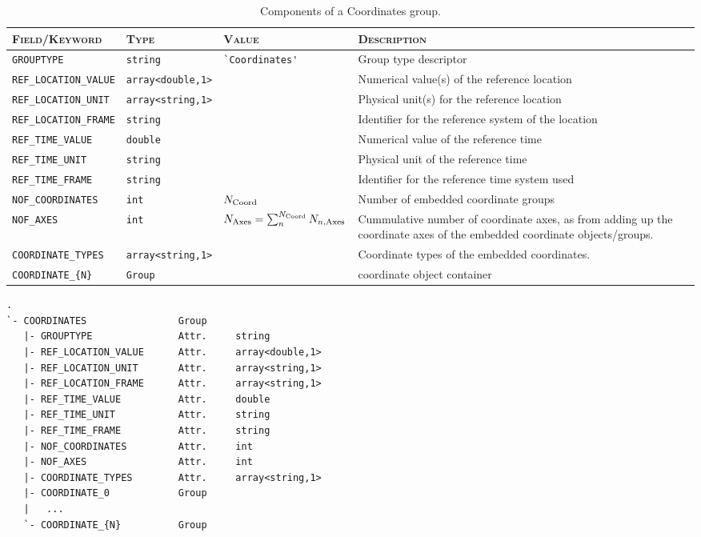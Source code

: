 \documentclass[a4paper,10pt,bibtotoc]{scrreprt}
\begin{document}
\begin{table}[ht]
 \centering
  \begin{tabular}{|lllp{5cm}|} 
    \hline
    \textsc{Field/Keyword} & \textsc{Type} & \textsc{Value} & \textsc{Description} \\
    \hline \hline
    \small{\verb|GROUPTYPE|} & \verb|string| & \verb|`Coordinates'| &
    Group type descriptor \\
    \small{\verb|REF_LOCATION_VALUE|}  & \verb|array<double,1>| &  &
    Numerical value(s) of the reference location \\
    \small{\verb|REF_LOCATION_UNIT|} & \verb|array<string,1>| &  &
    Physical unit(s) for the reference location \\
    \small{\verb|REF_LOCATION_FRAME|} & \texttt{string} &  &
    Identifier for the reference system of the location \\
    \small{\verb|REF_TIME_VALUE|} & \texttt{double} &  & Numerical value of the
    reference time \\
    \small{\verb|REF_TIME_UNIT|} & \texttt{string} &  & Physical unit of the
    reference time \\
    \small{\verb|REF_TIME_FRAME|} & \texttt{string} &  & Identifier for the reference
    time system used \\
    \small{\verb|NOF_COORDINATES|} & \texttt{int} & $N_{\rm Coord}$ & Number of
    embedded coordinate groups \\
    \small{\verb|NOF_AXES|} & \texttt{int} & $N_{\rm Axes} =
    \sum_{n}^{N_{\rm Coord}} N_{n,\rm Axes}$ & Cummulative number of
    coordinate axes, as from adding up the coordinate axes of the
    embedded coordinate objects/groups. \\
    \small{\verb|COORDINATE_TYPES|} & \verb|array<string,1>| &  &
    Coordinate types of the embedded coordinates. \\
    \hline
    \small{\verb|COORDINATE_{N}|} & \texttt{Group} &  & coordinate object
    container \\
    \hline
  \end{tabular}
  \caption{Components of a Coordinates group.}
  \label{tab:coordinates-group} 
\end{table}

\begin{lstlisting}
.
`- COORDINATES                Group     
   |- GROUPTYPE               Attr.     string
   |- REF_LOCATION_VALUE      Attr.     array<double,1>
   |- REF_LOCATION_UNIT       Attr.     array<string,1>
   |- REF_LOCATION_FRAME      Attr.     array<string,1>
   |- REF_TIME_VALUE          Attr.     double
   |- REF_TIME_UNIT           Attr.     string
   |- REF_TIME_FRAME          Attr.     string
   |- NOF_COORDINATES         Attr.     int
   |- NOF_AXES                Attr.     int
   |- COORDINATE_TYPES        Attr.     array<string,1>
   |- COORDINATE_0            Group
   |   ...
   `- COORDINATE_{N}          Group
\end{lstlisting}
\end{document}
